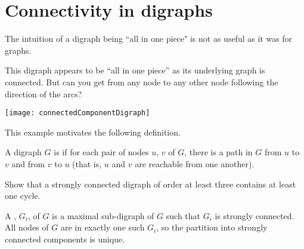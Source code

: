 \section{Connectivity in digraphs}
The intuition of a digraph being ``all in one piece" is not as useful as it was for graphs. 

\begin{Boxample}[0]
This digraph appears to be ``all in one piece'' as its underlying graph is connected. 
But can you get from any node to any other node following the direction of the arcs?
\begin{center}
\texttt{[image: connectedComponentDigraph]}
\end{center}
\end{Boxample}

This example motivates the following definition.

\begin{Definition}
A digraph $G$ is  if for each pair of nodes $u$, $v$ 
of $G$, there is a path in $G$ from $u$ to $v$ and from $v$ to $u$ (that is, $u$ and $v$ are reachable from one another).
\end{Definition}

\begin{Boxample}[4]
Show that a strongly connected digraph of order at least three contains at least one cycle.
\end{Boxample}

\begin{Definition} 
A , $G_i$, of $G$ is a maximal sub-digraph of $G$ 
such that $G_i$ is strongly connected. 
All nodes of $G$ are in exactly one such $G_i$, so the partition into strongly connected components is unique.
\end{Definition}

%

